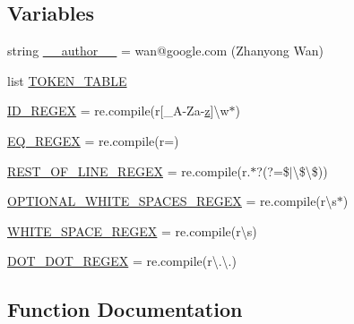 \subsection*{Variables}
\begin{DoxyCompactItemize}
\item 
string \mbox{\hyperlink{namespacegoogletest_1_1scripts_1_1pump_a607a37549519c02810e957e1cdf24790}{\+\_\+\+\_\+author\+\_\+\+\_\+}} = \textquotesingle{}wan@google.\+com (Zhanyong Wan)\textquotesingle{}
\item 
list \mbox{\hyperlink{namespacegoogletest_1_1scripts_1_1pump_a154dd004d59ae9a5fbe88927e5c7329e}{T\+O\+K\+E\+N\+\_\+\+T\+A\+B\+LE}}
\item 
\mbox{\hyperlink{namespacegoogletest_1_1scripts_1_1pump_a6b5380adbd6b51c2ec0ce084b8775c9f}{I\+D\+\_\+\+R\+E\+G\+EX}} = re.\+compile(r\textquotesingle{}\mbox{[}\+\_\+A-\/Za-\/\mbox{\hyperlink{_obj__test_2lib_2googletest-master_2googlemock_2test_2gmock-matchers__test_8cc_a196ff6a287f53f758b1506f21269fc77}{z}}\mbox{]}\textbackslash{}w$\ast$\textquotesingle{})
\item 
\mbox{\hyperlink{namespacegoogletest_1_1scripts_1_1pump_a9767f4cde408eaae46383b9c1fd6e3aa}{E\+Q\+\_\+\+R\+E\+G\+EX}} = re.\+compile(r\textquotesingle{}=\textquotesingle{})
\item 
\mbox{\hyperlink{namespacegoogletest_1_1scripts_1_1pump_adcca53cab9206919495b7499a34cd00a}{R\+E\+S\+T\+\_\+\+O\+F\+\_\+\+L\+I\+N\+E\+\_\+\+R\+E\+G\+EX}} = re.\+compile(r\textquotesingle{}.$\ast$?(?=\$$\vert$\textbackslash{}\$\textbackslash{}\$)\textquotesingle{})
\item 
\mbox{\hyperlink{namespacegoogletest_1_1scripts_1_1pump_a5541e891448a546123da2a33e1f410ee}{O\+P\+T\+I\+O\+N\+A\+L\+\_\+\+W\+H\+I\+T\+E\+\_\+\+S\+P\+A\+C\+E\+S\+\_\+\+R\+E\+G\+EX}} = re.\+compile(r\textquotesingle{}\textbackslash{}s$\ast$\textquotesingle{})
\item 
\mbox{\hyperlink{namespacegoogletest_1_1scripts_1_1pump_afcbc216b34a3ba89d22ac7778233e1ed}{W\+H\+I\+T\+E\+\_\+\+S\+P\+A\+C\+E\+\_\+\+R\+E\+G\+EX}} = re.\+compile(r\textquotesingle{}\textbackslash{}s\textquotesingle{})
\item 
\mbox{\hyperlink{namespacegoogletest_1_1scripts_1_1pump_a5a1380680c4727f9c84057c7504eca60}{D\+O\+T\+\_\+\+D\+O\+T\+\_\+\+R\+E\+G\+EX}} = re.\+compile(r\textquotesingle{}\textbackslash{}.\textbackslash{}.\textquotesingle{})
\end{DoxyCompactItemize}


\subsection{Function Documentation}
\mbox{\label{namespacegoogletest_1_1scripts_1_1pump_ad3452a9d016272f795c211b327349c9b}} 
